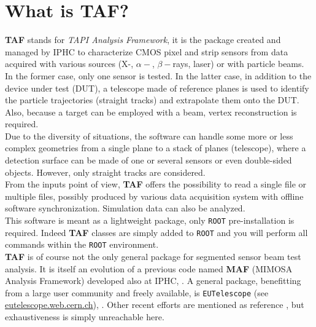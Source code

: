\documentclass[a4paper, 12pt, twoside]{article}
\newcommand{\TAF}{{\bf TAF }}
\newcommand{\MAF}{{\bf MAF }}
\begin{document}
\tableofcontents

\newpage 

\section{What is TAF?}

\TAF stands for {\it TAPI Analysis Framework}, it is the package created and managed by IPHC to characterize CMOS pixel and strip sensors from data acquired with various sources (X-, $\alpha-$, $\beta-$rays, laser) or with particle beams. In the former case, only one sensor is tested. In the latter case, in addition to the device under test (DUT), a telescope made of reference planes is used to identify the particle trajectories (straight tracks) and extrapolate them onto the DUT. Also, because a target can be employed with a beam, vertex reconstruction is required.\\
Due to the diversity of situations, the software can handle some more or less complex geometries from a single plane to a stack of planes (telescope), where a detection surface can be made of one or several sensors or even double-sided objects. However, only straight tracks are considered.\\
From the inputs point of view, \TAF offers the possibility to read a single file or multiple files, possibly produced by various data acquisition system with offline software synchronization. Simulation data can also be analyzed.\\

\noindent
This software is meant as a lightweight package, only {\tt ROOT} pre-installation is required. Indeed \TAF classes are simply added to {\tt ROOT} and you will perform all commands within the {\tt ROOT} environment.\\
\TAF is of course not the only general package for segmented sensor beam test analysis. It is itself an evolution of a previous code named \MAF (MIMOSA Analysis Framework) developed also at IPHC, \cite{noteMAF}. A general package, benefitting from a large user community and freely available, is {\tt EUTelescope} (see \href{http://eutelescope.web.cern.ch/}{eutelescope.web.cern.ch}), \cite{EUtelescope}. Other recent efforts are mentioned as reference \cite{FIRST, GLOBAL, JUDITH}, but exhaustiveness is simply unreachable here.\\

\vspace{0.8cm}
\end{document}

